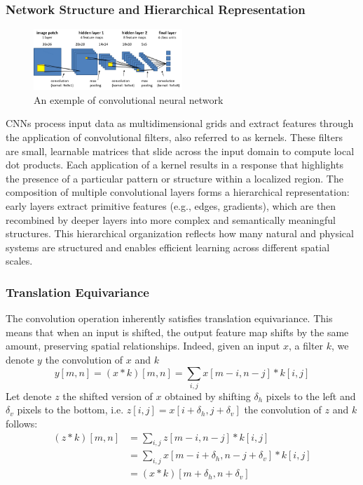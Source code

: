 \documentclass[a4paper,10pt]{article}
\theoremstyle{definition} %
\theoremstyle{definition} %
\theoremstyle{definition} %
\theoremstyle{definition} %
\newcommand{\0}{\boldsymbol{0}}
\begin{document}
\subsubsection{Network Structure and Hierarchical Representation}
\begin{figure}[h] %
    \centering
    \includegraphics[width=0.5\textwidth]{../images/CNN_illustration.png} %
    \caption{An exemple of convolutional neural network}
    \label{fig:CNN_illustration}
\end{figure}
CNNs process input data as multidimensional grids and extract features through the application of convolutional filters, also referred to as kernels. These filters are small, learnable matrices that slide across the input domain to compute local dot products. Each application of a kernel results in a response that highlights the presence of a particular pattern or structure within a localized region. The composition of multiple convolutional layers forms a hierarchical representation: early layers extract primitive features (e.g., edges, gradients), which are then recombined by deeper layers into more complex and semantically meaningful structures. This hierarchical organization reflects how many natural and physical systems are structured and enables efficient learning across different spatial scales.

\subsubsection{Translation Equivariance}
The convolution operation inherently satisfies translation equivariance. This means that when an input is shifted, the output feature map shifts by the same amount, preserving spatial relationships. 
Indeed, given an input $x$, a filter $k$, we denote $y$ the convolution of $x$ and $k$
\begin{equation*}
    y[m,n] = (x*k)[m,n] = \sum_{i,j} x[m-i,n-j]*k[i,j]
\end{equation*}
Let denote $z$ the shifted version of $x$ obtained by shifting $\delta_h$ pixels to the left and $\delta_v$ pixels to the bottom, i.e. $z[i,j] = x[i+\delta_h,j+\delta_v]$ the convolution of $z$ and $k$ follows:
\begin{align*}
    (z*k)[m,n] &= \sum_{i,j} z[m-i,n-j]*k[i,j]\\
    &= \sum_{i,j} x[m-i+\delta_h,n-j+\delta_v]*k[i,j]\\
    &= (x*k)[m+\delta_h,n+\delta_v]
\end{align*} 
\end{document}
